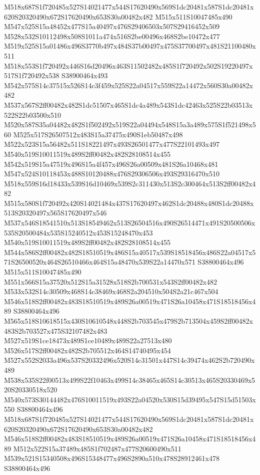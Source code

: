 \documentclass{article}
\begin{document}
\begin{multicols}{2}
M518x687S1f720485x527S14021477x544S17620490x569S1dc20481x587S1dc20481x620S20320490x672S17620490x653S30a00482x482 M515x511S10047485x490 M547x525S15a48452x477S15a40497x476S29406503x507S29416452x509 M528x532S10112498x508S1011a474x516S2be00496x468S2be10472x477 M519x525S15a01486x496S3770b497x484S37b00497x475S37700497x481S21100480x511 M518x553S1f720492x446S16d20496x463S11502482x485S1f720492x502S19220497x517S1f720492x538 S38900464x493 M542x575S14c37515x526S14c3f459x525S22a04517x559S22a14472x560S30a00482x482 M537x567S2ff00482x482S1dc51507x465S1dc4a489x543S1dc42463x525S22b03513x522S22b03500x510 M520x587S35a04482x482S1f502492x519S22a04494x548S15a3a489x575S1f521498x560 M525x517S26507512x483S15a37475x490S1eb50487x498 M522x523S15a56482x511S18221497x493S26501477x477S22101493x497 M540x519S10011519x489S2ff00482x482S28108514x455 M542x519S15a47519x496S15a4f457x496S26a00509x481S26a10468x481 M547x524S10118453x488S10120488x476S29306506x493S29316470x510 M518x559S16d18433x539S16d10469x539S2c311430x513S2c300464x513S2ff00482x482 M515x580S1f720492x420S14021484x437S17620497x462S1dc20488x480S1dc20488x513S20320497x565S17620497x546 M537x546S18541510x513S18549462x513S26504516x490S26514471x491S20500506x535S20500484x535S15240512x453S15248470x453 M540x519S10011519x489S2ff00482x482S28108514x455 M544x586S2ff00482x482S18510519x486S15a40517x539S18518456x486S22a04517x571S26500520x464S26510466x464S15a48470x539S22a14470x571 S38800464x496 M515x511S10047485x490 M551x566S15a37520x512S15a31528x518S2b700531x543S2ff00482x482 M533x532S14c30509x468S14c38469x468S2a204510x504S2a21c467x504 M546x518S2ff00482x483S18510519x489S26a00519x471S26a10458x471S18518456x489 S38800464x496 M565x518S10618515x430S10610548x448S2b703545x479S2b713504x459S2ff00482x483S2b703527x475S32107482x483 M527x519S1ce18473x489S1ce10489x489S22a27513x480 M526x517S2ff00482x482S2b705512x464S14740495x454 M527x552S2033a496x537S20332496x520S14c31501x447S14c39474x462S2b720490x489 M538x535S22f00513x499S22f10463x499S14c38465x465S14c30513x465S20330469x520S20330518x520 M540x573S30144482x476S10011519x493S22a04520x530S15d39495x547S15d51503x550 S38800464x496 M518x687S1f720485x527S14021477x544S17620490x569S1dc20481x587S1dc20481x620S20320490x672S17620490x653S30a00482x482 M546x518S2ff00482x483S18510519x489S26a00519x471S26a10458x471S18518456x489 M512x522S15a37489x485S1f702487x477S20600490x511 M539x521S15340508x496S15348477x496S2890a510x478S28912461x478 S38800464x496


\end{multicols}
\end{document}
